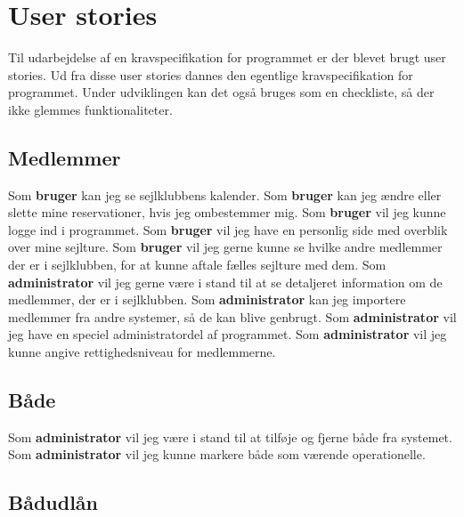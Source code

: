 \chapter{User stories}\label{User_stories}
Til udarbejdelse af en kravspecifikation for programmet er der blevet brugt user stories.
Ud fra disse user stories dannes den egentlige kravspecifikation for programmet.
Under udviklingen kan det også bruges som en checkliste, så der ikke glemmes funktionaliteter.

\section{Medlemmer}
Som \textbf{bruger} kan jeg se sejlklubbens kalender.
\newline
Som \textbf{bruger} kan jeg ændre eller slette mine reservationer, hvis jeg ombestemmer mig.
\newline
Som \textbf{bruger} vil jeg kunne logge ind i programmet.
\newline
Som \textbf{bruger} vil jeg have en personlig side med overblik over mine sejlture.
\newline
Som \textbf{bruger} vil jeg gerne kunne se hvilke andre medlemmer der er i sejlklubben, for at kunne aftale fælles sejlture med dem.
\newline
Som \textbf{administrator} vil jeg gerne være i stand til at se detaljeret information om de medlemmer, der er i sejlklubben.
\newline
Som \textbf{administrator} kan jeg importere medlemmer fra andre systemer, så de kan blive genbrugt.
\newline
Som \textbf{administrator} vil jeg have en speciel administratordel af programmet.
\newline
Som \textbf{administrator} vil jeg kunne angive rettighedsniveau for medlemmerne.

\section{Både}

Som \textbf{administrator} vil jeg være i stand til at tilføje og fjerne både fra systemet.
\newline
Som \textbf{administrator} vil jeg kunne markere både som værende operationelle.

\section{Bådudlån}

